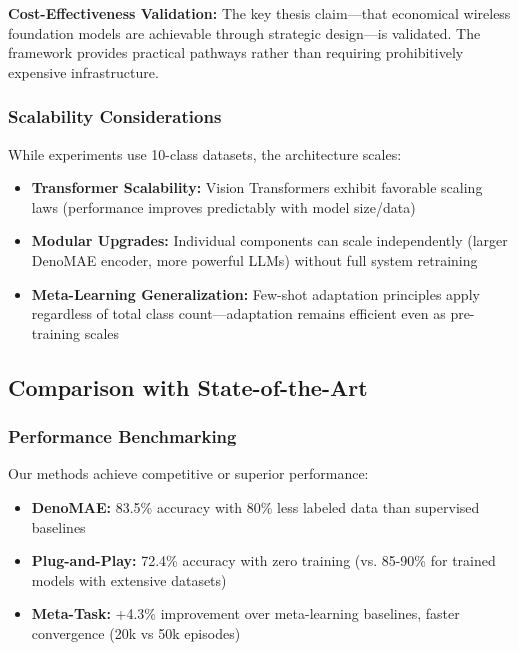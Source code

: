 \textbf{Cost-Effectiveness Validation:} The key thesis claim—that economical wireless foundation models are achievable through strategic design—is validated. The framework provides practical pathways rather than requiring prohibitively expensive infrastructure.

\subsubsection{Scalability Considerations}

While experiments use 10-class datasets, the architecture scales:

\begin{itemize}
    \item \textbf{Transformer Scalability:} Vision Transformers exhibit favorable scaling laws (performance improves predictably with model size/data)
    \item \textbf{Modular Upgrades:} Individual components can scale independently (larger DenoMAE encoder, more powerful LLMs) without full system retraining
    \item \textbf{Meta-Learning Generalization:} Few-shot adaptation principles apply regardless of total class count—adaptation remains efficient even as pre-training scales
\end{itemize}

\subsection{Comparison with State-of-the-Art}

\subsubsection{Performance Benchmarking}

Our methods achieve competitive or superior performance:

\begin{itemize}
    \item \textbf{DenoMAE:} 83.5\% accuracy with 80\% less labeled data than supervised baselines
    \item \textbf{Plug-and-Play:} 72.4\% accuracy with zero training (vs. 85-90\% for trained models with extensive datasets)
    \item \textbf{Meta-Task:} +4.3\% improvement over meta-learning baselines, faster convergence (20k vs 50k episodes)
\end{itemize}

